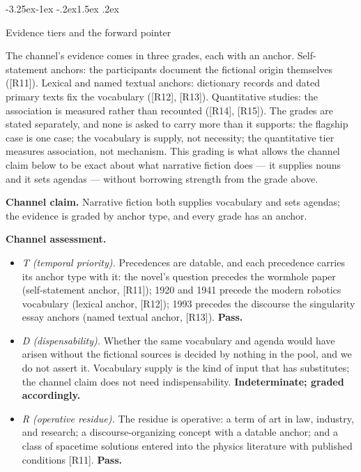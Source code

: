 \documentclass[11pt,a4paper]{article}
\makeatletter
\renewcommand\subsection{\@startsection{subsection}{2}{\z@}%
  {-3.25ex\@plus -1ex \@minus -.2ex}{1.5ex \@plus .2ex}%
  {\normalfont\large\bfseries\raggedright}}
\makeatother
\begin{document}
\subsection{Evidence tiers and the forward pointer}

The channel's evidence comes in three grades, each with an anchor. Self-statement anchors: the participants document the fictional origin themselves ([R11]). Lexical and named textual anchors: dictionary records and dated primary texts fix the vocabulary ([R12], [R13]). Quantitative studies: the association is measured rather than recounted ([R14], [R15]). The grades are stated separately, and none is asked to carry more than it supports: the flagship case is one case; the vocabulary is supply, not necessity; the quantitative tier measures association, not mechanism. This grading is what allows the channel claim below to be exact about what narrative fiction does — it supplies nouns and it sets agendas — without borrowing strength from the grade above.

\textbf{Channel claim.} Narrative fiction both supplies vocabulary and sets agendas; the evidence is graded by anchor type, and every grade has an anchor.

\textbf{Channel assessment.}

\begin{itemize}[leftmargin=1.6em,itemsep=2pt,parsep=0pt,topsep=3pt]
\item \textit{T (temporal priority).} Precedences are datable, and each precedence carries its anchor type with it: the novel's question precedes the wormhole paper (self-statement anchor, [R11]); 1920 and 1941 precede the modern robotics vocabulary (lexical anchor, [R12]); 1993 precedes the discourse the singularity essay anchors (named textual anchor, [R13]). \textbf{Pass.}
\item \textit{D (dispensability).} Whether the same vocabulary and agenda would have arisen without the fictional sources is decided by nothing in the pool, and we do not assert it. Vocabulary supply is the kind of input that has substitutes; the channel claim does not need indispensability. \textbf{Indeterminate; graded accordingly.}
\item \textit{R (operative residue).} The residue is operative: a term of art in law, industry, and research; a discourse-organizing concept with a datable anchor; and a class of spacetime solutions entered into the physics literature with published conditions [R11]. \textbf{Pass.}
\end{itemize}
\end{document}
